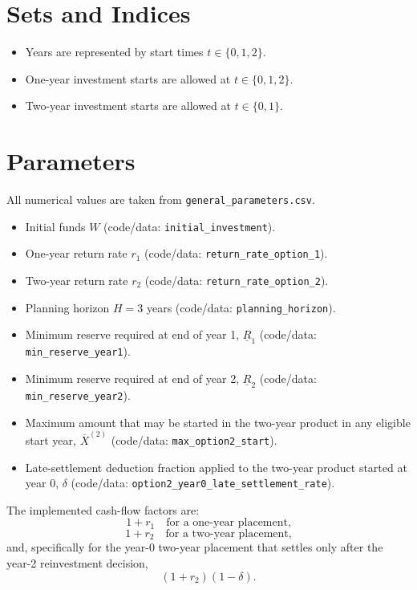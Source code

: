 \section*{Sets and Indices}

\begin{itemize}
    \item Years are represented by start times $t \in \{0,1,2\}$.
    \item One-year investment starts are allowed at $t \in \{0,1,2\}$.
    \item Two-year investment starts are allowed at $t \in \{0,1\}$.
\end{itemize}

\section*{Parameters}

All numerical values are taken from \texttt{general\_parameters.csv}.

\begin{itemize}
    \item Initial funds $W$ (code/data: \texttt{initial\_investment}).
    \item One-year return rate $r_1$ (code/data: \texttt{return\_rate\_option\_1}).
    \item Two-year return rate $r_2$ (code/data: \texttt{return\_rate\_option\_2}).
    \item Planning horizon $H=3$ years (code/data: \texttt{planning\_horizon}).
    \item Minimum reserve required at end of year 1, $\underline{R}_1$ (code/data: \texttt{min\_reserve\_year1}).
    \item Minimum reserve required at end of year 2, $\underline{R}_2$ (code/data: \texttt{min\_reserve\_year2}).
    \item Maximum amount that may be started in the two-year product in any eligible start year, $\overline{X}^{(2)}$ (code/data: \texttt{max\_option2\_start}).
    \item Late-settlement deduction fraction applied to the two-year product started at year 0, $\delta$ (code/data: \texttt{option2\_year0\_late\_settlement\_rate}).
\end{itemize}

The implemented cash-flow factors are:
\[
1+r_1 \quad \text{for a one-year placement,}
\]
\[
1+r_2 \quad \text{for a two-year placement,}
\]
and, specifically for the year-0 two-year placement that settles only after the year-2 reinvestment decision,
\[
(1+r_2)(1-\delta).
\]

